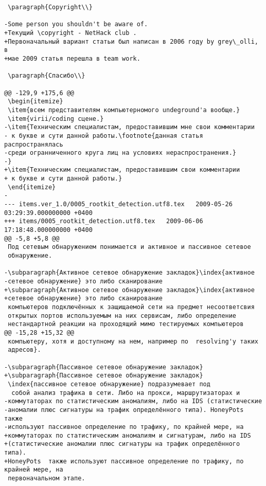 \begin{verbatim}
 \paragraph{Copyright\\}

-Some person you shouldn't be aware of.
+Текущий \copyright - NetHack club .
+Первоначальный вариант статьи был написан в 2006 году by grey\_olli, в
+мае 2009 статья перешла в team work.

 \paragraph{Спасибо\\}

@@ -129,9 +175,6 @@
 \begin{itemize}
 \item{всем представителям компьютерномого undeground'а вообще.}
 \item{virii/coding сцене.}
-\item{Техническим специалистам, предоставившим мне свои комментарии
- к букве и сути данной работы.\footnote{данная статья распространялась
-среди огранниченного круга лиц на условиях нераспространения.}
-}
+\item{Техническим специалистам, предоставившим свои комментарии
+ к букве и сути данной работы.}
 \end{itemize}
-
--- items.ver_1.0/0005_rootkit_detection.utf8.tex	2009-05-26 03:29:39.000000000 +0400
+++ items/0005_rootkit_detection.utf8.tex	2009-06-06 17:18:48.000000000 +0400
@@ -5,8 +5,8 @@
 Под сетевым обнаружением понимается и активное и пассивное сетевое
 обнаружение.

-\subparagraph{Активное сетевое обнаружение закладок}\index{активное
-сетевое обнаружение} это либо сканирование
+\subparagraph{Активное сетевое обнаружение закладок}\index{активное
+сетевое обнаружение} это либо сканирование
 компьютеров подключённых к защищаемой сети на предмет несоответсвия
 открытых портов используемым на них сервисам, либо определение
 нестандартной реакции на проходящий мимо тестируемых компьютеров
@@ -15,28 +15,32 @@
 компьютеру, хотя и доступному на нем, например по  resolving'у таких
 адресов}.

-\subparagraph{Пассивное сетевое обнаружение закладок}
+\subparagraph{Пассивное сетевое обнаружение закладок}
 \index{пассивное сетевое обнаружение} подразумевает под
  собой анализ трафика в сети. Либо на прокси, маршрутизаторах и
-коммутаторах по статистическим аномалиям, либо на IDS (статистические
-аномалии плюс сигнатуры на трафик определённого типа). HoneyPots  также
-используют пассивное определение по трафику, по крайней мере, на
+коммутаторах по статистическим аномалиям и сигнатурам, либо на IDS
+(статистические аномалии плюс сигнатуры на трафик определённого типа).
+HoneyPots  также используют пассивное определение по трафику, по крайней мере, на
 первоначальном этапе.


\end{verbatim}
